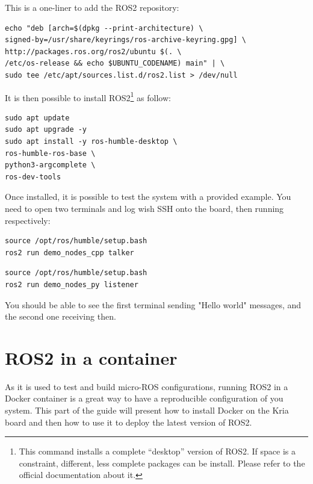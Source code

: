\documentclass[10pt]{article}
\begin{document}
This is a one-liner to add the ROS2 repository:

\begin{tcolorbox}
\begin{verbatim}
echo "deb [arch=$(dpkg --print-architecture) \
signed-by=/usr/share/keyrings/ros-archive-keyring.gpg] \
http://packages.ros.org/ros2/ubuntu $(. \
/etc/os-release && echo $UBUNTU_CODENAME) main" | \
sudo tee /etc/apt/sources.list.d/ros2.list > /dev/null
\end{verbatim}
\end{tcolorbox}

It is then possible to install ROS2\footnote{This command installs a complete ``desktop'' version of ROS2. If space is a constraint, different, less complete packages can be install. Please refer to the official documentation about it.} as follow:

\begin{tcolorbox}
\begin{verbatim}
sudo apt update
sudo apt upgrade -y
sudo apt install -y ros-humble-desktop \
ros-humble-ros-base \
python3-argcomplete \
ros-dev-tools
\end{verbatim}
\end{tcolorbox}

Once installed, it is possible to test the system with a provided example. You need to open two terminals and log wish SSH onto the board, then running respectively:

\begin{tcolorbox}
\begin{verbatim}
source /opt/ros/humble/setup.bash
ros2 run demo_nodes_cpp talker
\end{verbatim}
\end{tcolorbox}



\begin{tcolorbox}
\begin{verbatim}
source /opt/ros/humble/setup.bash
ros2 run demo_nodes_py listener
\end{verbatim}
\end{tcolorbox}


You should be able to see the first terminal sending "Hello world" messages, and the second one receiving then.


\section{ROS2 in a container}
\label{sec:ros2-container}
As it is used to test and build micro-ROS configurations, running ROS2 in a Docker container is a great way to have a reproducible configuration
of you system. This part of the guide will present how to install Docker on the Kria board and then how to use it to deploy the latest
version of ROS2.
\end{document}
